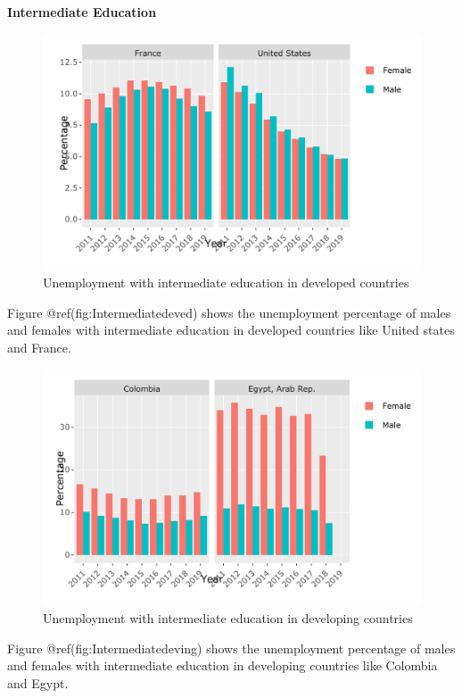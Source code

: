 \documentclass[
]{article}
\begin{document}
\clearpage

\textbf{Intermediate Education}

\begin{figure}
\centering
\includegraphics{The_Outsiders_5513_files/figure-latex/Intermediatedeved-1.pdf}
\caption{Unemployment with intermediate education in developed
countries}
\end{figure}

Figure @ref(fig:Intermediatedeved) shows the unemployment percentage of
males and females with intermediate education in developed countries
like United states and France.

\begin{figure}
\centering
\includegraphics{The_Outsiders_5513_files/figure-latex/Intermediatedeving-1.pdf}
\caption{Unemployment with intermediate education in developing
countries}
\end{figure}

Figure @ref(fig:Intermediatedeving) shows the unemployment percentage of
males and females with intermediate education in developing countries
like Colombia and Egypt.
\end{document}
